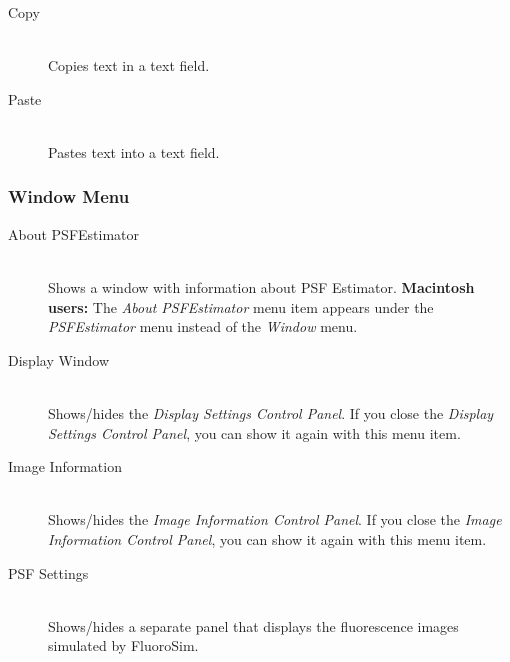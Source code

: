 \documentclass[11pt,titlepage,twoside]{article}
\begin{document}
\begin{description}

  \item[Copy] \hfill \\
  Copies text in a text field.
  
  \item[Paste] \hfill \\
  Pastes text into a text field.
  
\end{description}

\subsubsection{Window Menu}

\begin{description}

  \item[About PSFEstimator] \hfill \\
  Shows a window with information about PSF Estimator. \textbf{Macintosh users:} The \emph{About PSFEstimator} menu item appears under the \emph{PSFEstimator} menu instead of the \emph{Window} menu. 

  \item[Display Window] \hfill \\
  Shows/hides the \emph{Display Settings Control Panel}. If you close the \emph{Display Settings Control Panel}, you can show it again with this menu item.
  
  \item[Image Information] \hfill \\
    Shows/hides the \emph{Image Information Control Panel}. If you close the \emph{Image Information Control Panel}, you can show it again with this menu item.
  
  \item[PSF Settings] \hfill \\
  Shows/hides a separate panel that displays the fluorescence images simulated by FluoroSim.

\end{description}

\end{document}
